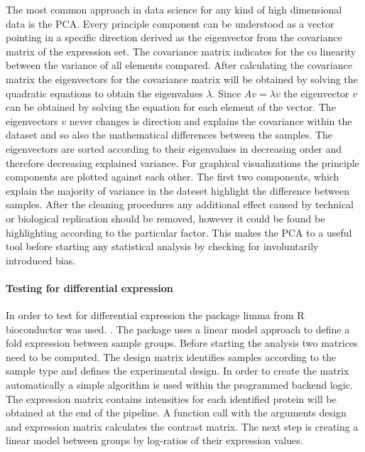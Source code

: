 \documentclass[
  11pt,
]{article}
\begin{document}
The most common approach in data science for any kind of high
dimensional data is the PCA. Every principle component can be understood
as a vector pointing in a specific direction derived as the eigenvector
from the covariance matrix of the expression set. The covariance matrix
indicates for the co linearity between the variance of all elements
compared. After calculating the covariance matrix the eigenvectors for
the covariance matrix will be obtained by solving the quadratic
equations to obtain the eigenvalues \(\lambda\). Since
\(A v = \lambda v\) the eigenvector \(v\) can be obtained by solving the
equation for each element of the vector. The eigenvectors \(v\) never
changes is direction and explains the covariance within the dataset and
so also the mathematical differences between the samples. The
eigenvectors are sorted according to their eigenvalues in decreasing
order and therefore decreasing explained variance. For graphical
visualizations the principle components are plotted against each other.
The first two components, which explain the majority of variance in the
dateset highlight the difference between samples. After the cleaning
procedures any additional effect caused by technical or biological
replication should be removed, however it could be found be highlighting
according to the particular factor. This makes the PCA to a useful tool
before starting any statistical analysis by checking for involuntarily
introduced bias.

\hypertarget{testing-for-differential-expression}{%
\paragraph{Testing for differential
expression}\label{testing-for-differential-expression}}

In order to test for differential expression the package limma from R
bioconductor was used. \citep{Phipson2016}. The package uses a linear
model approach to define a fold expression between sample groups. Before
starting the analysis two matrices need to be computed. The design
matrix identifies samples according to the sample type and defines the
experimental design. In order to create the matrix automatically a
simple algorithm is used within the programmed backend logic. The
expression matrix contains intensities for each identified protein will
be obtained at the end of the pipeline. A function call with the
arguments design and expression matrix calculates the contrast matrix.
The next step is creating a linear model between groups by log-ratios of
their expression values.
\end{document}
